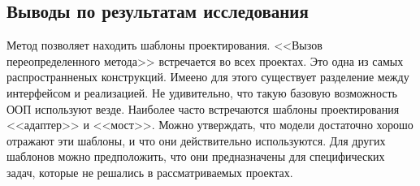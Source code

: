\subsection{Выводы по результатам исследования}

Метод позволяет находить шаблоны проектирования.
<<Вызов переопределенного метода>> встречается во всех проектах.
Это одна из самых распространненых конструкций.
Имеено для этого существует разделение между интерфейсом и реализацией.
Не удивительно, что такую базовую возможность ООП используют везде.
Наиболее часто встречаются шаблоны проектирования <<адаптер>> и <<мост>>.
Можно утверждать, что модели достаточно хорошо отражают эти шаблоны, и что
они действительно используются.
Для других шаблонов можно предположить, что они предназначены для специфических задач,
которые не решались в рассматриваемых проектах.
